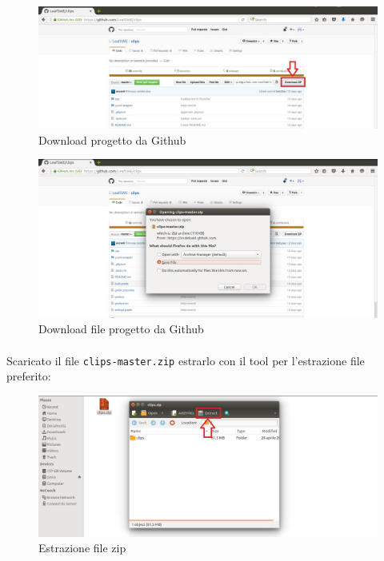 \documentclass[../ManualeSviluppatore.tex]{subfiles}
\begin{document}
			\begin{figure} [h]
				\centering
				\includegraphics[width=\textwidth]{img/DownloadZip}
				\caption{Download progetto da Github}
				\label{fig:DownloadZip}
			\end{figure}
			
			\begin{figure} [h]
				\centering
				\includegraphics[width=\textwidth]{img/Download}
				\caption{Download file progetto da Github}
				\label{fig:DownloadZip2}
			\end{figure}
			
		\paragraph*{}
			Scaricato il file \verb|clips-master.zip| estrarlo con il tool per l'estrazione file preferito:
			
			\begin{figure} [h]
				\centering
				\includegraphics[width=\textwidth]{img/EstraiZip}
				\caption{Estrazione file zip}
				\label{fig:EstraiZip}
			\end{figure}
			
\end{document}
